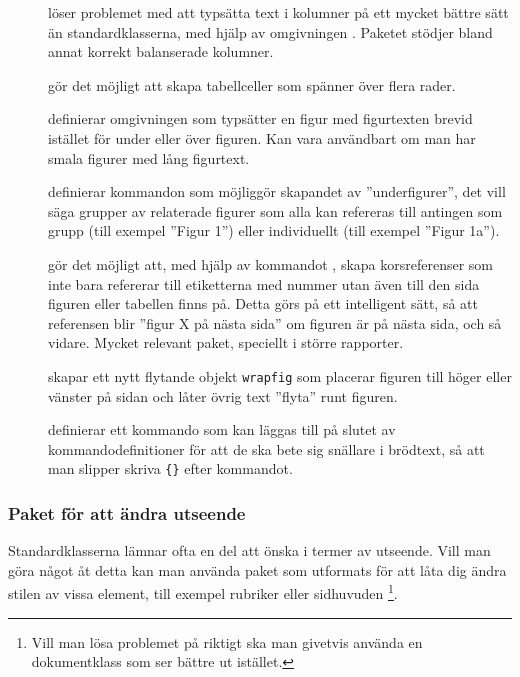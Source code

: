 \documentclass[lang=sv,ptsize=10pt,font=none,nomath,titles=bf,../../a4.tex]{subfiles}
\begin{document}
\begin{description}
 	\item[]
 	löser problemet med att typsätta text i kolumner på ett mycket bättre
 	sätt än standardklasserna, med hjälp av omgivningen .
 	Paketet stödjer bland annat korrekt balanserade kolumner.
 	
	\item[]
	gör det möjligt att skapa tabellceller som spänner över flera
	rader.
	
	\item[]
	definierar omgivningen  som typsätter en figur med
	figurtexten brevid istället för under eller över figuren. Kan vara
	användbart om man har smala figurer med lång figurtext.
	
	\item[]
	definierar kommandon som möjliggör skapandet av ”underfigurer”, det
	vill säga grupper av relaterade figurer som alla kan refereras till
	antingen som grupp (till exempel ”Figur 1”) eller individuellt (till
	exempel ”Figur 1a”).
	
	\item[]
	gör det möjligt att, med hjälp av kommandot ,
	skapa korsreferenser
	som inte bara refererar till etiketterna med nummer utan även till den
	sida figuren eller tabellen finns på. Detta görs på ett intelligent
	sätt, så att referensen blir ”figur X på nästa sida” om figuren är på
	nästa sida, och så vidare. Mycket relevant paket, speciellt i större
	rapporter.
	
	\item[]
	skapar ett nytt flytande objekt \texttt{wrapfig} som placerar figuren
	till höger eller vänster på sidan och låter övrig text ”flyta” runt
	figuren.
	
	\item[]
	definierar ett kommando  som kan läggas till på slutet av
	kommandodefinitioner för att de ska bete sig snällare i brödtext, så
	att man slipper skriva \texttt{\{\}} efter kommandot.
\end{description}

\subsubsection{Paket för att ändra utseende}
Standardklasserna lämnar ofta en del att önska i termer av utseende. Vill
man göra något åt detta kan man använda paket som utformats för att låta
dig ändra stilen av vissa element, till exempel rubriker eller sidhuvuden%
\footnote{Vill man lösa problemet på riktigt ska man givetvis använda en
dokumentklass som ser bättre ut istället.}.
\end{document}
